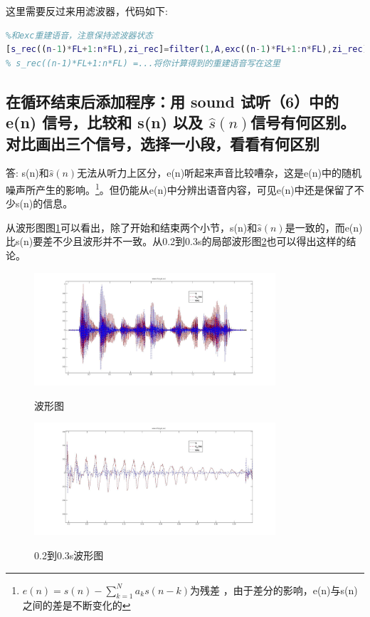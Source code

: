 \documentclass{ctexart}
\begin{document}
这里需要反过来用滤波器，代码如下:
\begin{lstlisting}[language=matlab]
% (5) 在此位置写程序，用filter函数
%和exc重建语音，注意保持滤波器状态
[s_rec((n-1)*FL+1:n*FL),zi_rec]=filter(1,A,exc((n-1)*FL+1:n*FL),zi_rec);
% s_rec((n-1)*FL+1:n*FL) =...将你计算得到的重建语音写在这里
\end{lstlisting}
\subsection{
    在循环结束后添加程序：用 sound 试听（6）中的 e(n) 信号，比较和 s(n) 以及 
$\hat{s}(n)$信号有何区别。对比画出三个信号，选择一小段，看看有何区别}

答:
s(n)和$\hat{s}(n)$无法从听力上区分，e(n)听起来声音比较嘈杂，这是e(n)中的随机噪声所产生的影响。\footnote{$e(n)=s(n)-\sum_{k=1}^{N}a_ks(n-k)$为残差
，由于差分的影响，e(n)与s(n)之间的差是不断变化的}。但仍能从e(n)中分辨出语音内容，可见e(n)中还是保留了不少s(n)的信息。

从波形图图\ref{6wave}可以看出，除了开始和结束两个小节，s(n)和$\hat{s}(n)$是一致的，而e(n)比s(n)要差不少且波形并不一致。从0.2到0.3s的局部波形图\ref{6detail}也可以得出这样的结论。
\begin{figure}
    \centering
    \includegraphics[width=0.8\textwidth]{6_wave.jpg}\\
    \caption{波形图\label{6wave}}
\end{figure}


\begin{figure}
    \centering
    \includegraphics[width=0.8\textwidth]{6_detail.jpg}\\
    \caption{0.2到0.3s波形图\label{6detail}}
\end{figure}
\end{document}
